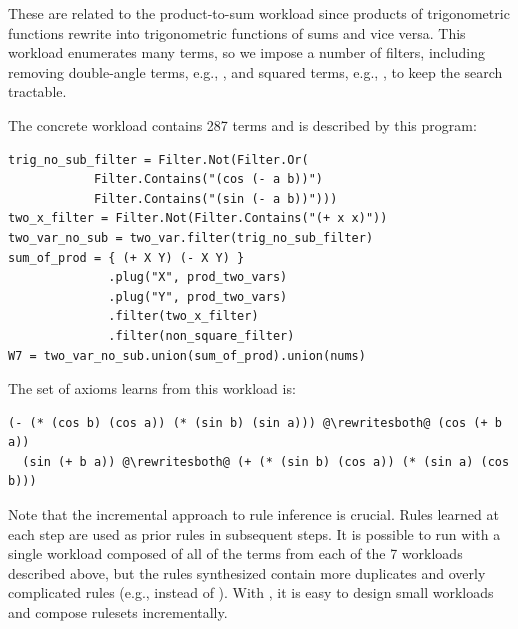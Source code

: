 These are related to the product-to-sum workload
  since products of trigonometric functions rewrite
  into trigonometric functions of sums and vice versa.
This workload enumerates many terms, so we impose a number
of filters, including removing double-angle terms,
  e.g., , and squared terms, e.g., ,
  to keep the search tractable.

The concrete workload contains 287 terms and is described by this \enumo program:

\begin{lstlisting}
trig_no_sub_filter = Filter.Not(Filter.Or(
            Filter.Contains("(cos (- a b))")
            Filter.Contains("(sin (- a b))")))
two_x_filter = Filter.Not(Filter.Contains("(+ x x)"))
two_var_no_sub = two_var.filter(trig_no_sub_filter)
sum_of_prod = { (+ X Y) (- X Y) }
              .plug("X", prod_two_vars)
              .plug("Y", prod_two_vars)
              .filter(two_x_filter)
              .filter(non_square_filter)
W7 = two_var_no_sub.union(sum_of_prod).union(nums)
\end{lstlisting}

The set of axioms \enumo learns from this workload is:
\begin{lstlisting}[escapechar=@]
  (- (* (cos b) (cos a)) (* (sin b) (sin a))) @\rewritesboth@ (cos (+ b a))
  (sin (+ b a)) @\rewritesboth@ (+ (* (sin b) (cos a)) (* (sin a) (cos b)))
\end{lstlisting}

Note that the incremental approach to rule inference is crucial.
Rules learned at each step are used as prior rules in subsequent steps.
It is possible to run \ff with a single workload composed of all of the
  terms from each of the 7 workloads described above, but the rules synthesized
  contain more duplicates and overly complicated rules
  (e.g.,  instead of ).
With \enumo, it is easy to design small workloads and compose
  rulesets incrementally.

